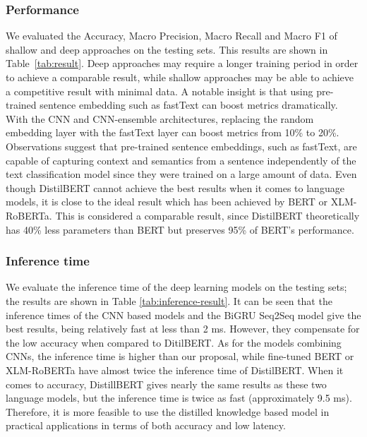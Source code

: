 \documentclass[sn-mathphys,Numbered]{sn-jnl}%
\theoremstyle{thmstyleone}%
\theoremstyle{thmstyletwo}%
\theoremstyle{thmstylethree}%
\begin{document}
\subsubsection{Performance}
We evaluated the Accuracy, Macro Precision, Macro Recall and Macro F1 of shallow and deep approaches on the testing sets. This results are shown in Table~\ref{tab:result}. Deep approaches may require a longer training period in order to achieve a comparable result, while shallow approaches may be able to achieve a competitive result with minimal data. A notable insight is that using pre-trained sentence embedding such as fastText can boost metrics dramatically. With the CNN and CNN-ensemble architectures, replacing the random embedding layer with the fastText layer can boost metrics from 10\% to 20\%. Observations suggest that pre-trained sentence embeddings, such as fastText, are capable of capturing context and semantics from a sentence independently of the text classification model since they were trained on a large amount of data. Even though DistilBERT cannot achieve the best results when it comes to language models, it is close to the ideal result which has been achieved by BERT or XLM-RoBERTa. This is considered a comparable result, since DistilBERT theoretically has 40\% less parameters than BERT but preserves 95\% of BERT's performance.

\subsubsection{Inference time}
We evaluate the inference time of the deep learning models on the testing sets; the results are shown in Table \ref{tab:inference-result}. It can be seen that the inference times of the CNN based models and the BiGRU Seq2Seq model give the best results, being relatively fast at less than 2 ms. However, they compensate for the low accuracy when compared to DitilBERT. As for the models combining CNNs, the inference time is higher than our proposal, while fine-tuned BERT or XLM-RoBERTa have almost twice the inference time of DistilBERT. When it comes to accuracy, DistillBERT gives nearly the same results as these two language models, but the inference time is twice as fast (approximately 9.5 ms). Therefore, it is more feasible to use the distilled knowledge based model in practical applications in terms of both accuracy and low latency.
\end{document}

